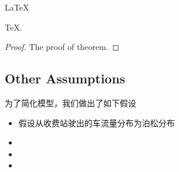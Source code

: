 \documentclass{mcmthesis}
\begin{document}
\begin{Theorem} \label{thm:latex}
\LaTeX
\end{Theorem}
\begin{Lemma} \label{thm:tex}
\TeX .
\end{Lemma}
\begin{proof}
The proof of theorem.
\end{proof}

\subsection{Other Assumptions}
为了简化模型，我们做出了如下假设
\begin{itemize}
\item 假设从收费站驶出的车流量分布为泊松分布
\item
\item
\item
\end{itemize}

\lipsum[7]
\end{document}
